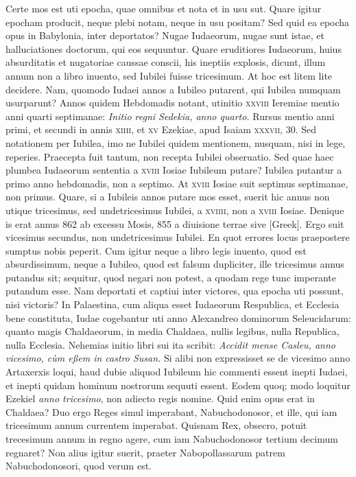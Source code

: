 \begin{parnumbers}
{}
Certe mos est uti epocha, quae omnibus et nota et in usu sut.
\lnr{}Quare
igitur epocham producit, neque plebi notam, neque in usu positam?
\lnr{}Sed quid ea epocha opus in Babylonia, inter deportatos?
\lnr{}Nugae Iudaeorum,
nugae sunt istae, et halluciationes doctorum, qui eos sequuntur.
\lnr{}Quare eruditiores Iudaeorum, huius absurditatis et nugatoriae
caussae conscii, his ineptiis explosis, dicunt, illum annum non a
libro inuento, sed Iubilei fuisse tricesimum.
\lnr{}At hoc est litem lite decidere.
\lnr{}Nam, quomodo Iudaei annos a Iubileo putarent, qui Iubilea
numquam usurparunt?
\lnr{}Annos quidem Hebdomadis notant, utinitio
\textsc{xxviii} Ieremiae mentio anni quarti septimanae: \textit{Initio regni
Sedekia, anno quarto.}
\lnr{}Rursus mentio anni primi, et secundi in annis
\textsc{xiiii}, et \textsc{xv} Ezekiae, apud Isaiam \textsc{xxxvii}, 30.
\lnr{}Sed notationem
per Iubilea, imo ne Iubilei quidem mentionem, nusquam, nisi
in lege, reperies.
\lnr{}Praecepta fuit tantum, non recepta Iubilei obseruatio.
\lnr{}Sed quae haec plumbea Iudaeorum sententia a \textsc{xviii} Iosiae
Iubileum putare?
\lnr{}Iubilea putantur a primo anno hebdomadis, non
a septimo.
\lnr{}At \textsc{xviii} Iosiae suit septimus septimanae, non primus.
\lnr{}Quare, si a Iubileis annos putare mos esset, suerit hic annus non utique
tricesimus, sed undetricesimus Iubilei, a \textsc{xviiii}, non a
\textsc{xviii} Iosiae.
\lnr{}Denique is erat annus 862 ab excessu Mosis, 855 a
diuisione terrae sive \textgreek{[Greek]}.
\lnr{}Ergo suit vicesimus secundus, non
undetricesimus Iubilei.
\lnr{}En quot errores locus praepostere sumptus
nobis peperit.
\lnr{}Cum igitur neque a libro legis inuento, quod est absurdissimum,
neque a Iubileo, quod est falsum dupliciter, ille tricesimus
annus putandus sit; sequitur, quod negari non potest, a
quodam rege tunc imperante putandum esse.
\lnr{}Nam deportati et captiui
inter victores, qua epocha uti possunt, nisi victoris?
\lnr{}In Palaestina,
cum aliqua esset Iudaeorum Respublica, et Ecclesia bene constituta,
Iudae cogebantur uti anno Alexandreo dominorum Seleucidarum:
quanto magis Chaldaeorum, in media Chaldaea, nullis legibus,
nulla Republica, nulla Ecclesia.
\lnr{}Nehemias initio libri sui ita
scribit: \textit{Accidit mense Casleu, anno vicesimo, cùm eßem in castro Susan.}
\lnr{}Si alibi non expressisset se de vicesimo anno Artaxerxis loqui, haud
dubie aliquod Iubileum hic commenti essent inepti Iudaei, et inepti
quidam hominum nostrorum sequuti essent.
\lnr{}Eodem quoq; modo
loquitur Ezekiel \textit{anno tricesimo}, non adiecto regis nomine.
\lnr{}Quid enim opus erat in Chaldaea?
\lnr{}Duo ergo Reges simul imperabant,
Nabuchodonosor, et ille, qui iam tricesimum annum currentem
imperabat.
\lnr{}Quisnam Rex, obsecro, potuit trecesimum annum in regno
agere, cum iam Nabuchodonosor tertium decimum regnaret?
\lnr{}Non alius igitur suerit, praeter Nabopollassarum patrem Nabuchodonosori,
quod verum est.


\end{parnumbers}
